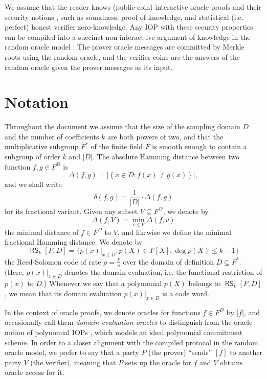 \documentclass[11pt,article,oneside]{memoir}
\theoremstyle{definition}
\theoremstyle{remark}
\DeclareMathOperator{\RS}{\mathsf{RS}}
\begin{document}
We assume that the reader knows (public-coin) interactive oracle proofs and their security notions  \cite{IOPs}, such as soundness, proof of knowledge, and statistical (i.e. perfect) honest verifier zero-knowledge. 
Any IOP with these security properties can be compiled into a succinct non-interact-ive argument of knowledge in the random oracle model \cite{IOPs}:
The prover oracle messages are committed by Merkle roots using the random oracle, and the verifier coins are the answers of the random oracle given the prover messages as its input.


\section{Notation}
Throughout the document we assume that the size of the sampling domain $D$ and the number of coefficients $k$ are both powers of two, and that the multiplicative subgroup $F^*$ of the finite field $F$ is smooth enough to contain a subgroup of order $k$ and $|D|$. 
The absolute Hamming distance between two function $f,g\in F^D$ is
\begin{equation*}
\Delta(f, g) = \big|\left\{x\in D: f(x)\neq g(x)\right\}\big|,
\end{equation*}
and we shall write 
\[
\delta(f, g) = \frac{1}{|D|}\cdot \Delta(f,g)
\] 
for its fractional variant.
Given any subset $V\subseteq F^D$, we denote by
\[
\Delta(f, V) = \min_{v\in V} \Delta(f,v)
\]
the minimal distance of $f\in F^D$ to $V$, and likewise we define the minimal fractional Hamming distance.
We denote by
\begin{equation*}
\RS_k[F,D] = \big\{ \left.p(x)\right|_{x\in D} : p(X)\in F[X], \deg p(X) \leq k-1 \big\}
\end{equation*}
the Reed-Solomon code of rate $\rho = \frac{k}{n}$ over the domain of definition $D\subseteq F^*$. 
(Here, $p(x)|_{x\in D}$ denotes the domain evaluation, i.e.  the functional restriction of $p(x)$ to $D$.)
Whenever we say that a polynomial $p(X)$ belongs to $\RS_k[F,D]$, we mean that its domain evaluation $p(x)|_{x\in D}$ is a code word. 

In the context of oracle proofs, we denote oracles for  functions $f\in F^D$ by
$\big[ f \big]$, and occasionally call them \textit{domain evaluation oracles} to distinguish from the oracle notion of polynomial IOPs \cite{DARK}, which models an ideal polynomial commitment scheme.
In order to a closer alignment with the compiled protocol in the random oracle model, we prefer to say that a party $P$ (the prover) ``sends'' $[f]$ to another party $V$ (the verifier), meaning that $P$ sets
up the oracle for $f$ and $V$ obtains oracle access for it.
\end{document}
